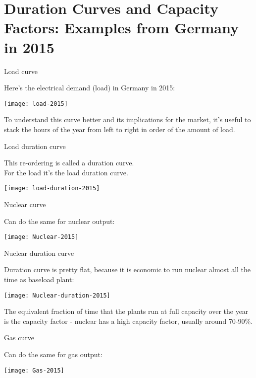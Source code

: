 \documentclass[10pt,aspectratio=169,dvipsnames]{beamer}
\begin{document}
\section{Duration Curves and Capacity Factors: Examples from Germany in 2015}

\begin{frame}{Load curve}

  Here's the electrical demand (load) in Germany in 2015:

  \centering
  \texttt{[image: load-2015]}

  \raggedright

  To understand this curve better and its implications for the market,
  it's useful to stack the hours of the year from left to right in
  order of the amount of load.

\end{frame}


\begin{frame}{Load duration curve}

  This re-ordering is called a \alert{duration curve}.\\
  For the load it's the \alert{load duration curve}.

  \centering
  \texttt{[image: load-duration-2015]}

\end{frame}

\begin{frame}{Nuclear curve}

  Can do the same for nuclear output:

  \centering
  \texttt{[image: Nuclear-2015]}

\end{frame}

\begin{frame}{Nuclear duration curve}

  Duration curve is pretty flat, because it is economic to run nuclear almost all the time as  \alert{baseload plant}:

  \centering
  \texttt{[image: Nuclear-duration-2015]}

  \raggedright
  The equivalent fraction of time that the plants run at full capacity over the year is the \alert{capacity factor} - nuclear has a high capacity factor, usually around 70-90\%.
\end{frame}


\begin{frame}{Gas curve}

  Can do the same for gas output:

  \centering
  \texttt{[image: Gas-2015]}

\end{frame}
\end{document}
